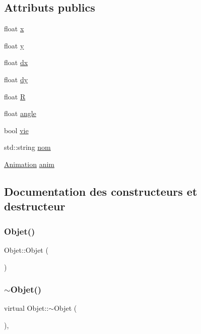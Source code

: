 \subsection*{Attributs publics}
\begin{DoxyCompactItemize}
\item 
float \hyperlink{class_objet_a2c73c2c45d5339df8228966b655351de}{x}
\item 
float \hyperlink{class_objet_a875f758fbf6434825b3acdc011b362a2}{y}
\item 
float \hyperlink{class_objet_ae31175118003ae9a862c9ce10f853045}{dx}
\item 
float \hyperlink{class_objet_a6e0d923cb4450478ed31e94ee7f5a531}{dy}
\item 
float \hyperlink{class_objet_ac931833c077df49ec3f909aba38e0121}{R}
\item 
float \hyperlink{class_objet_a1e3e095030fbc53562c5561cabd2e800}{angle}
\item 
bool \hyperlink{class_objet_a50498a805e7a5db752bf5bfd9fbb7b5b}{vie}
\item 
std\+::string \hyperlink{class_objet_aec3ba4223b80d485e9c8c72b17d53b3a}{nom}
\item 
\hyperlink{class_animation}{Animation} \hyperlink{class_objet_a4d1cd0327bccc4022d7b9bbba2c041b5}{anim}
\end{DoxyCompactItemize}


\subsection{Documentation des constructeurs et destructeur}
\mbox{\label{class_objet_aefdd826d50085897e4894ffef4597d04}} 
\subsubsection{\texorpdfstring{Objet()}{Objet()}}
{\footnotesize\ttfamily Objet\+::\+Objet (\begin{DoxyParamCaption}{ }\end{DoxyParamCaption})\hspace{0.3cm}{\ttfamily [inline]}}

\mbox{\label{class_objet_a77a195bb1452ef4221b5080632cd7757}} 
\subsubsection{\texorpdfstring{$\sim$\+Objet()}{~Objet()}}
{\footnotesize\ttfamily virtual Objet\+::$\sim$\+Objet (\begin{DoxyParamCaption}{ }\end{DoxyParamCaption})\hspace{0.3cm}{\ttfamily [inline]}, {\ttfamily [virtual]}}



